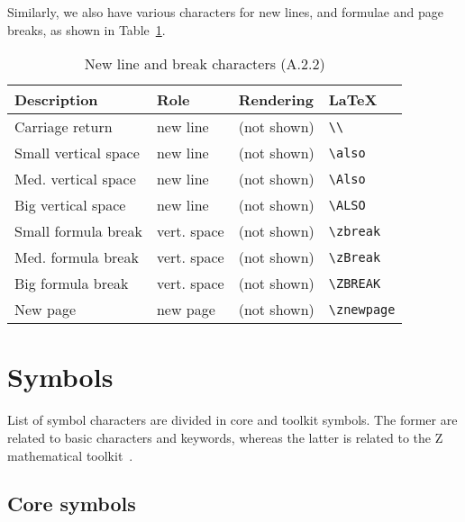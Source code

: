 \documentclass{article}
\newcommand{\smallcaption}[1]{{\small (#1)}}
\begin{document}
Similarly, we also have various characters for new lines,
and formulae and page breaks, as shown in Table~\ref{tbl:special-other-newline}.
%
\begin{table}[ht]
\centering
\begin{tabular}{|l|l|l|l|}
   \hline
   \textbf{Description} & \textbf{Role} & \textbf{Rendering} & \textbf{\LaTeX} \\
   \hline
   Carriage return      & new line    & (not shown) & \verb|\\| \\
   \hline
   Small vertical space & new line    & (not shown) & \verb|\also| \\
   \hline
   Med. vertical space  & new line    & (not shown) & \verb|\Also| \\
   \hline
   Big vertical space   & new line    & (not shown) & \verb|\ALSO| \\
   \hline
   Small formula break  & vert. space & (not shown) & \verb|\zbreak| \\
   \hline
   Med. formula break   & vert. space & (not shown) & \verb|\zBreak| \\
   \hline
   Big formula break    & vert. space & (not shown) & \verb|\ZBREAK| \\
   \hline
   New page             & new page    & (not shown) & \verb|\znewpage| \\
   \hline
\end{tabular}
\caption{New line and break characters \smallcaption{A.2.2}}\label{tbl:special-other-newline}
\end{table}

\section{Symbols}\label{sec:symbol}

List of symbol characters are divided in core and toolkit symbols.
The former are related to basic characters and keywords, whereas
the latter is related to the Z mathematical toolkit~\cite[Appendix~B]{isoz}.

\subsection{Core symbols}\label{sec:symbol-core}
\end{document}

